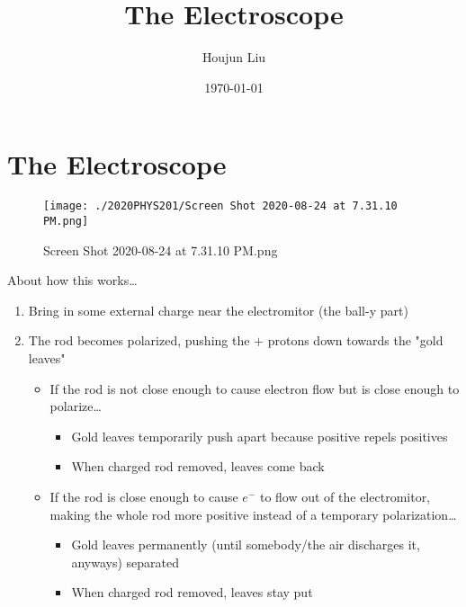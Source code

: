 \documentclass[letterpaper]{article}
\author{Houjun Liu}
\date{\today}
\title{The Electroscope}
\renewcommand\maketitle{}
\begin{document}
\maketitle


\section{The Electroscope}
\label{sec:org3b8b93b}
\begin{figure}[htbp]
\centering
\texttt{[image: ./2020PHYS201/Screen Shot 2020-08-24 at 7.31.10 PM.png]}
\caption{Screen Shot 2020-08-24 at 7.31.10 PM.png}
\end{figure}

About how this works\ldots{}

\begin{enumerate}
\item Bring in some external charge near the electromitor (the ball-y part)
\item The rod becomes polarized, pushing the \(+\) protons down towards the
"gold leaves"

\begin{itemize}
\item If the rod is not close enough to cause electron flow but is close
enough to polarize\ldots{}

\begin{itemize}
\item Gold leaves temporarily push apart because positive repels
positives
\item When charged rod removed, leaves come back
\end{itemize}

\item If the rod is close enough to cause \(e^-\) to flow out of the
electromitor, making the whole rod more positive instead of a
temporary polarization\ldots{}

\begin{itemize}
\item Gold leaves permanently (until somebody/the air discharges it,
anyways) separated
\item When charged rod removed, leaves stay put
\end{itemize}
\end{itemize}
\end{enumerate}
\end{document}
